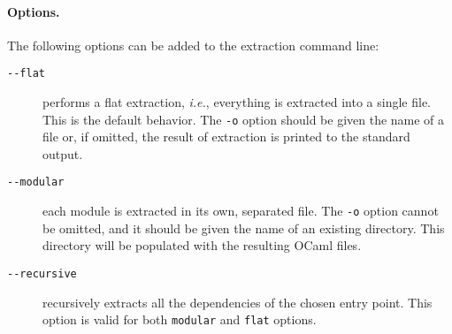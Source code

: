 \paragraph{Options.} The following options can be added to the
extraction command line:
\begin{description}
\item[\texttt{-{}-flat}] performs a flat extraction, \emph{i.e.}, everything is
  extracted into a single file. This is the default behavior. The \texttt{-o}
  option should be given the name of a file or, if omitted, the result of
  extraction is printed to the standard output.
\item[\texttt{-{}-modular}] each module is extracted in its own, separated
  file. The \texttt{-o} option cannot be omitted, and it should be given the
  name of an existing directory. This directory will be populated with the
  resulting OCaml files.
\item[\texttt{-{}-recursive}] recursively extracts all the dependencies of the
  chosen entry point. This option is valid for both \texttt{modular} and
  \texttt{flat} options.
\end{description}


